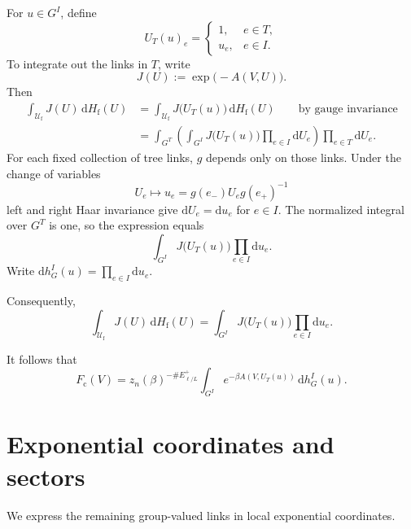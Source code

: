 \documentclass[10pt,reqno]{amsart}
\theoremstyle{definition}
\theoremstyle{remark}
\numberwithin{equation}{section}
\numberwithin{figure}{section}
\newcommand{\dd}{\mathrm d}
\newcommand{\Uf}{\mathcal U_{\mathrm f}}
\newcommand{\Hf}{H_{\mathrm f}}
\newcommand{\Fc}{F_{\mathrm c}}
\begin{document}
For $u\in G^I$, define
\begin{equation}\label{eq:display-069}
U_T(u)_e=
\begin{cases}
1,&e\in T,\\
u_e,&e\in I.
\end{cases}
\end{equation}
To integrate out the links in $T$, write
\begin{equation}\label{eq:display-070}
J(U):=\exp\bigl(-A(V,U)\bigr).
\end{equation}
Then
\begin{equation}\label{eq:display-071}
\begin{aligned}
\int_{\Uf}J(U)\,\dd\Hf(U)
&=\int_{\Uf}J\bigl(U_T(u)\bigr)\,\dd\Hf(U)
\qquad\text{by gauge invariance}\\
&=\int_{G^T}\left(\int_{G^I}J\bigl(U_T(u)\bigr)
\prod_{e\in I}\dd U_e\right)\prod_{e\in T}\dd U_e.
\end{aligned}
\end{equation}
For each fixed collection of tree links, $g$ depends only on those links. Under the change of variables
\begin{equation}\label{eq:display-072}
U_e\longmapsto u_e=g(e_-)U_eg(e_+)^{-1}
\end{equation}
left and right Haar invariance give $\dd U_e=\dd u_e$ for $e\in I$. The normalized integral over $G^T$ is one, so the expression equals
\begin{equation}\label{eq:display-073}
\int_{G^I}J\bigl(U_T(u)\bigr)\prod_{e\in I}\dd u_e.
\end{equation}
Write $\dd h_G^I(u)=\prod_{e\in I}\dd u_e$.

Consequently,
\begin{equation}\label{eq:display-074}
\int_{\Uf}J(U)\,\dd\Hf(U)
=\int_{G^I}J\bigl(U_T(u)\bigr)\prod_{e\in I}\dd u_e.
\end{equation}

It follows that
\begin{equation}\label{eq:display-075}
\boxed{
\Fc(V)=z_n(\beta)^{-\#E_{\ell/L}^+}
\int_{G^I}e^{-\beta A(V,U_T(u))}\,\dd h_G^I(u).
}
\end{equation}
\section{Exponential coordinates and sectors}
We express the remaining group-valued links in local exponential coordinates.
\end{document}
